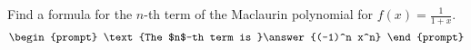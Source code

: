 \documentclass{ximera}
\author{Gregory Hartman \and Matthew Carr}
\begin{document}
\begin{exercise}





Find a formula for the $n$-th term of the Maclaurin polynomial for $f(x)=\frac{1}{1+x}$. 
\[
\begin{prompt}
\text{The $n$-th term is }\answer{(-1)^n x^n}
\end{prompt}
\]

\end{exercise}
\end{document}
